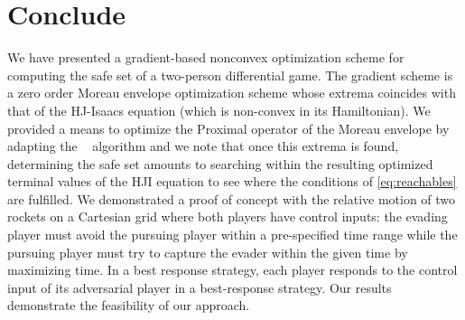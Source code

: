 \section{Conclude}
\label{sec:conclude}
We have presented a gradient-based nonconvex optimization scheme for computing the safe set of a two-person differential game. The gradient scheme is a zero order Moreau envelope optimization scheme whose extrema coincides with that of the HJ-Isaacs equation (which is non-convex in its Hamiltonian). We provided a means to optimize the Proximal operator of the Moreau envelope by adapting the ~\citet{HJMAD} algorithm and we note that once this extrema is found, determining the safe set amounts to searching within the resulting optimized terminal values of the HJI equation to see where the conditions of \eqref{eq:reachables} are fulfilled. We demonstrated a proof of concept with the relative motion of two rockets on a Cartesian grid where both players have control inputs: the evading player must avoid the pursuing player within a pre-specified time range while the pursuing player must try to capture the evader within the given time by maximizing time. In a best response strategy, each player responds to the control input of its adversarial player in a best-response strategy. Our results demonstrate the feasibility of our approach.